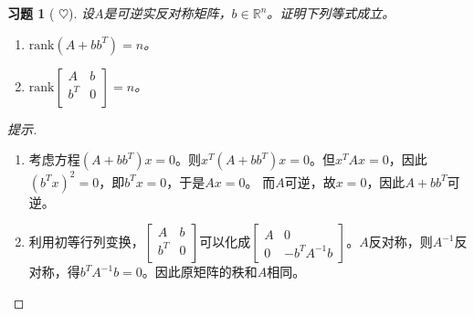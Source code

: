 \documentclass[UTF8]{ctexart}
\newcommand{\rank}{{\mathrm{rank}}}
\newtheorem{ex}[thm]{习题}
\begin{document}
\begin{ex}[ $\heartsuit  $]
	设$A$是可逆实反对称矩阵，$b\in \mathbb{R}^n$。证明下列等式成立。
	\begin{enumerate}
		\item $\rank(A+bb^T)=n$。
		\item $\rank\begin{bmatrix}
				A & b\\
				b^T & 0\\
		\end{bmatrix}=n$。
	\end{enumerate}
\end{ex}
\begin{proof}[提示]
	\begin{enumerate}
		\item 考虑方程$(A+bb^T)x=0$。则$x^T(A+bb^T)x=0$。但$x^TAx=0$，因此$(b^Tx)^2=0$，即$b^Tx=0$，于是$Ax=0$。
			而$A$可逆，故$x=0$，因此$A+bb^T$可逆。
			\item 利用初等行列变换，$\begin{bmatrix}
				A & b\\
				b^T & 0\\
		\end{bmatrix}$可以化成$\begin{bmatrix}
		A & 0 \\ 0 & -b^TA^{-1}b
	\end{bmatrix}$。$A$反对称，则$A^{-1}$反对称，得$b^TA^{-1}b=0$。因此原矩阵的秩和$A$相同。
	\end{enumerate}
\end{proof}
\end{document}
